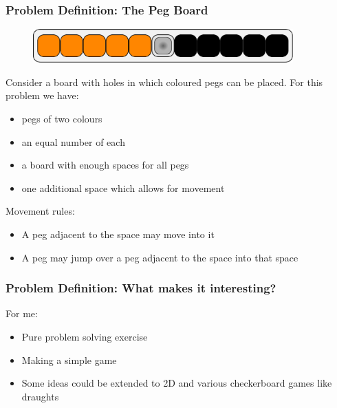 \documentclass{beamer}
\begin{document}
	\begin{frame}
		\frametitle{Problem Definition: The Peg Board}
		\begin{figure}
		\includegraphics[width=10cm]{pegboardlayout}
		\end{figure}
		Consider a board with holes in which coloured pegs can be placed. For this problem we have: 
		\begin{itemize}
			\item pegs of two colours
			\item an equal number of each
			\item a board with enough spaces for all pegs
			\item one additional space which allows for movement
		\end{itemize}
		Movement rules:
		\begin{itemize}
			\item A peg adjacent to the space may move into it
			\item A peg may jump over a peg adjacent to the space into that space
		\end{itemize}	
		
	\end{frame}
		
	\begin{frame}
		\frametitle{Problem Definition: What makes it interesting?}
		For me:
		\begin{itemize}
			\item Pure problem solving exercise
			\item Making a simple game
			\item Some ideas could be extended to 2D and various checkerboard games like draughts
		\end{itemize}
	\end{frame}	
	
\end{document}
